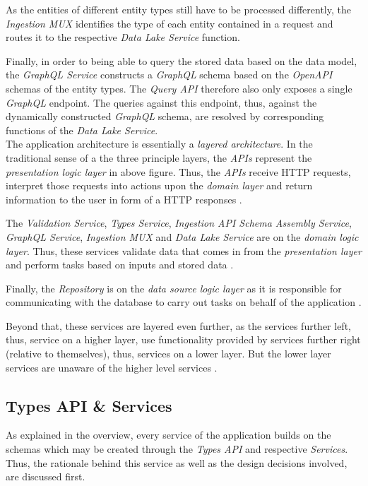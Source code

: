 As the entities of different entity types still have to be processed differently, the \emph{Ingestion MUX} identifies the type of each entity contained in a request and routes it to the respective \emph{Data Lake Service} function.\par 
Finally, in order to being able to query the stored data based on the data model, the \emph{GraphQL Service} constructs a \emph{GraphQL} schema based on the \emph{OpenAPI} schemas of the entity types. The \emph{Query API} therefore also only exposes a single \emph{GraphQL} endpoint. The queries against this endpoint, thus, against the dynamically constructed \emph{GraphQL} schema, are resolved by corresponding functions of the \emph{Data Lake Service}.\\

The application architecture is essentially a \emph{layered architecture}. In the traditional sense of a the three principle layers, the \emph{APIs} represent the \emph{presentation logic layer} in above figure. Thus, the \emph{APIs} receive HTTP requests, interpret those requests into actions upon the \emph{domain layer} and return information to the user in form of a HTTP responses \cite{AppArchitecture}.\par
The \emph{Validation Service}, \emph{Types Service}, \emph{Ingestion API Schema Assembly Service}, \emph{GraphQL Service}, \emph{Ingestion MUX} and \emph{Data Lake Service} are on the \emph{domain logic layer}. Thus, these services validate data that comes in from the \emph{presentation layer} and perform tasks based on inputs and stored data \cite{AppArchitecture}.\par
Finally, the \emph{Repository} is on the \emph{data source logic layer} as it is responsible for communicating with the database to carry out tasks on behalf of the application \cite{AppArchitecture}.\par
Beyond that, these services are layered even further, as the services further left, thus, service on a higher layer, use functionality provided by services further right (relative to themselves), thus, services on a lower layer. But the lower layer services are unaware of the higher level services \cite{AppArchitecture}.

\subsection{Types API \& Services} \label{sec:Types API & Services}
As explained in the overview, every service of the application builds on the schemas which may be created through the \emph{Types API} and respective \emph{Services}. Thus, the rationale behind this service as well as the design decisions involved, are discussed first.\par

